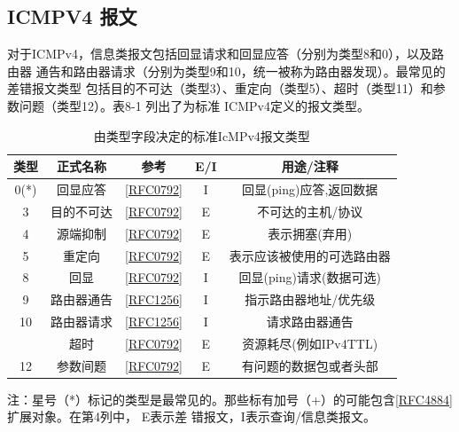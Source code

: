 \subsection{ICMPV4 报文}
对于ICMPv4，信息类报文包括回显请求和回显应答（分别为类型8和0），以及路由器
通告和路由器请求（分别为类型9和10，统一被称为路由器发现）。最常见的差错报文类型
包括目的不可达（类型3）、重定向（类型5）、超时（类型11）和参数问题（类型12）。表8-1
列出了为标准 ICMPv4定义的报文类型。

\begin{table}[]
	\centering
	\caption{由类型字段决定的标准IcMPv4报文类型}
	\begin{tabular}{c|c|c|c|c}
		\hline
		类型   & 正式名称  & 参考 & E/I & 用途/注释            \\ \hline
		0(*) & 回显应答  &  \href{https://www.rfc-editor.org/rfc/rfc0792}{[RFC0792]}  & I   & 回显(ping)应答,返回数据  \\ \hline
		3    & 目的不可达 &  \href{https://www.rfc-editor.org/rfc/rfc0792}{[RFC0792]}  & E   & 不可达的主机/协议        \\ \hline
		4    & 源端抑制  &  \href{https://www.rfc-editor.org/rfc/rfc0792}{[RFC0792]}  & E   & 表示拥塞(弃用)         \\ \hline
		5    & 重定向   &  \href{https://www.rfc-editor.org/rfc/rfc0792}{[RFC0792]}  & E   & 表示应该被使用的可选路由器    \\ \hline
		8    & 回显    &  \href{https://www.rfc-editor.org/rfc/rfc0792}{[RFC0792]}  & I   & 回显(ping)请求(数据可选) \\ \hline
		9    & 路由器通告 &  \href{https://www.rfc-editor.org/rfc/rfc1256}{[RFC1256]}  & I   & 指示路由器地址/优先级      \\ \hline
		10   & 路由器请求 &  \href{https://www.rfc-editor.org/rfc/rfc1256}{[RFC1256]}  & I   & 请求路由器通告          \\ \hline
			& 超时    &  \href{https://www.rfc-editor.org/rfc/rfc0792}{[RFC0792]}  & E   & 资源耗尽(例如IPv4TTL)  \\ \hline
		12   & 参数间题  &  \href{https://www.rfc-editor.org/rfc/rfc0792}{[RFC0792]}  & E   & 有问题的数据包或者头部      \\ \hline
	\end{tabular}
\end{table}

注：星号（*）标记的类型是最常见的。那些标有加号（+）的可能包含\href{https://www.rfc-editor.org/rfc/rfc4884}{[RFC4884]} 扩展对象。在第4列中，
E表示差 错报文，I表示查询/信息类报文。

